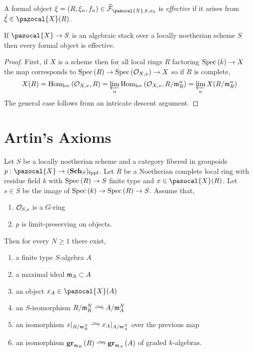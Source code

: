 \documentclass[12pt]{article}
\newcommand{\fppf}{\mathrm{fppf}}
\renewcommand{\X}{\pazocal{X}}
\renewcommand{\F}{\mathcal{F}}
\begin{document}
\begin{defn}
A formal object $\xi = (R, \xi_n, f_n) \in \wh{\F}_{\X, k, x_0}$ is \textit{effective} if it arises from $\tilde{\xi} \in \X(R)$.
\end{defn}

\begin{lemma}
If $\X \to S$ is an algebraic stack over a locally noetherian scheme $S$ then every formal object is effective.
\end{lemma}

\begin{proof}
First, if $X$ is a scheme then for all local rings $R$ factoring $\mathrm{Spec}\left( k \right) \to X$ the map corresponds to $\mathrm{Spec}\left( R \right) \to \mathrm{Spec}\left( \mathcal{O}_{X, x} \right) \to X$ so if $R$ is complete,
\[ X(R) = \mathrm{Hom}_{\text{loc}} \left( \mathcal{O}_{X, x}, R \right) = \varprojlim_{n} \mathrm{Hom}_{\text{loc}} \left( \mathcal{O}_{X, x}, R/\mathfrak{m}_R^n \right) = \varprojlim_n X(R/\mathfrak{m}_R^n) \]
The general case follows from an intricate descent argument.
\end{proof}

\section{Artin's Axioms}

\begin{theorem}
Let $S$ be a locally noetherian scheme and a category fibered in groupoids $p : \X \to (\Sch_S)_{\fppf}$. Let $R$ be a Noetherian complete local ring with residue field $k$ with $\mathrm{Spec}\left( R \right) \to S$ finite type and $x \in \X(R)$. Let $s \in S$ be the image of $\mathrm{Spec}\left( k \right) \to \mathrm{Spec}\left( R \right) \to S$. Assume that,
\begin{enumerate}
\item $\mathcal{O}_{S, s}$ is a $G$-ring
\item $p$ is limit-preserving on objects.
\end{enumerate}
Then for every $N \ge 1$ there exist,
\begin{enumerate}
\item a finite type $S$-algebra $A$
\item a maximal ideal $\mathfrak{m}_A \subset A$
\item an object $x_A \in \X(A)$
\item an $S$-isomorphism $R / \m_R^N \iso A / \m_A^N$
\item an isomorphism $x|_{R/\m_R^N} \iso x_A |_{A / \m_A^N}$ over the previous map
\item an isomorphism $\gr{\m_R}{R} \iso \gr{\m_A}{A}$ of graded $k$-algebras.
\end{enumerate}
\end{theorem}
\end{document}

